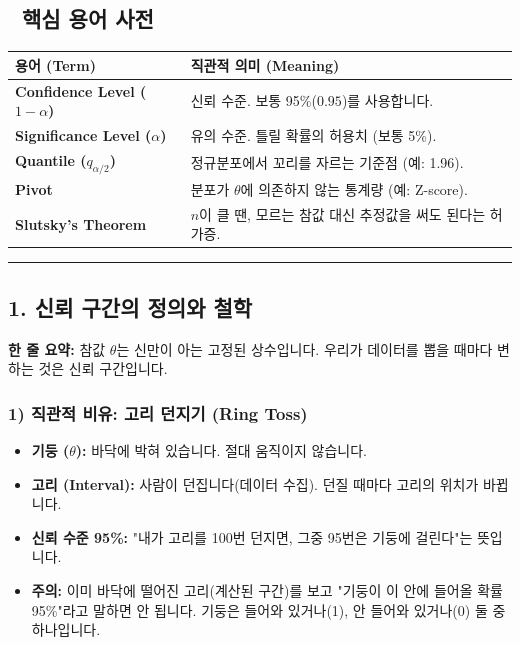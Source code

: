 \documentclass[11pt,a4paper]{book}
\theoremstyle{definition}
\begin{document}
\subsection*{📝 핵심 용어 사전}
\begin{table}[h]
\centering
\begin{tabularx}{\textwidth}{|p{}|X|}
\hline
\textbf{용어 (Term)} & \textbf{직관적 의미 (Meaning)} \\
\hline
\textbf{Confidence Level ($1-\alpha$)} & 신뢰 수준. 보통 95\%($0.95$)를 사용합니다. \\
\hline
\textbf{Significance Level ($\alpha$)} & 유의 수준. 틀릴 확률의 허용치 (보통 5\%). \\
\hline
\textbf{Quantile ($q_{\alpha/2}$)} & 정규분포에서 꼬리를 자르는 기준점 (예: 1.96). \\
\hline
\textbf{Pivot} & 분포가 $\theta$에 의존하지 않는 통계량 (예: Z-score). \\
\hline
\textbf{Slutsky's Theorem} & $n$이 클 땐, 모르는 참값 대신 추정값을 써도 된다는 허가증. \\
\hline
\end{tabularx}
\end{table}

\vspace{0.5cm}\hrule\vspace{0.5cm}

\subsection{1. 신뢰 구간의 정의와 철학}


\begin{conceptbox}[title={개념 1: 움직이는 것은 '고리(구간)'이지 '기둥(참값)'이 아니다}]
\textbf{한 줄 요약:} 참값 $\theta$는 신만이 아는 고정된 상수입니다. 우리가 데이터를 뽑을 때마다 변하는 것은 신뢰 구간입니다.
\end{conceptbox}

\subsubsection*{1) 직관적 비유: 고리 던지기 (Ring Toss)}
\begin{itemize}
    \item \textbf{기둥 ($\theta$):} 바닥에 박혀 있습니다. 절대 움직이지 않습니다.
    \item \textbf{고리 (Interval):} 사람이 던집니다(데이터 수집). 던질 때마다 고리의 위치가 바뀝니다.
    \item \textbf{신뢰 수준 95\%:} "내가 고리를 100번 던지면, 그중 95번은 기둥에 걸린다"는 뜻입니다.
    \item \textbf{주의:} 이미 바닥에 떨어진 고리(계산된 구간)를 보고 "기둥이 이 안에 들어올 확률 95\%"라고 말하면 안 됩니다. 기둥은 들어와 있거나(1), 안 들어와 있거나(0) 둘 중 하나입니다.
\end{itemize}
\end{document}
